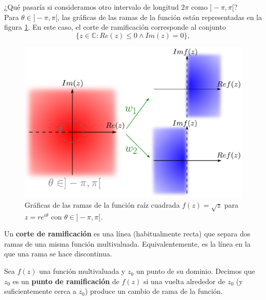 \begin{ejemplo}
¿Qué pasaría si consideramos otro intervalo de longitud $2\pi$ como $]-\pi, \pi[$?
\\

Para $\theta \in ]-\pi, \pi[$, las gráficas de las ramas de la función están representadas en la figura \ref{fig:Raiz2}. En este caso, el corte de ramificación corresponde al conjunto 
\begin{equation}
\{ z \in \mathbb{C} : Re(z) \leq 0 \wedge Im(z) = 0\},    \label{CorteRama2}
\end{equation}

\begin{figure}[H]
    \centering
    \includegraphics[scale = 0.5]{Figuras/RaizCuadrada2.pdf}
    \caption{Gráficas de las ramas de la función raíz cuadrada $f(z) = \sqrt{z}$ para $z = r e^{i\theta}$ con $\theta \in ]-\pi,\pi[$.}
    \label{fig:Raiz2}
\end{figure}

\end{ejemplo}

\begin{defi}
Un \textbf{corte de ramificación} es una línea (habitualmente recta) que separa dos ramas de una misma función multivaluada. Equivalentemente, es la línea en la que una rama se hace discontinua.
\end{defi}

\begin{defi}
Sea $f(z)$ una función multivaluada y $z_0$ un punto de su dominio. Decimos que $z_0$ es un \textbf{punto de ramificación} de $f(z)$ si una vuelta alrededor de $z_0$ (y suficientemente cerca a $z_0$) produce un cambio de rama de la función. 
\end{defi}


